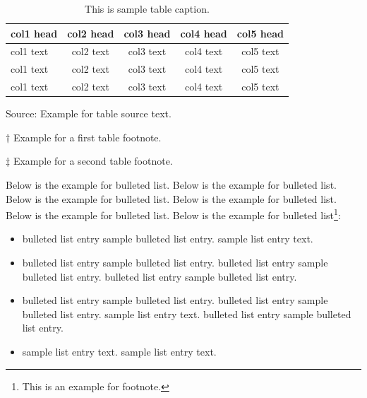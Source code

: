 \documentclass[AMA,STIX1COL]{WileyNJD-SP}
\begin{document}
\begin{center}
\begin{table}[t]%
\centering
\caption{This is sample table caption.\label{tab2}}%
\begin{tabular*}{500pt}{@{\extracolsep\fill}lcccc@{\extracolsep\fill}}
\toprule
\textbf{col1 head} & \textbf{col2 head}  & \textbf{col3 head}  & \textbf{col4 head}  & \textbf{col5 head} \\
\midrule
col1 text & col2 text  & col3 text  & col4 text  & col5 text\tnote{$\dagger$}   \\
col1 text & col2 text  & col3 text  & col4 text  & col5 text   \\
col1 text & col2 text  & col3 text  & col4 text  & col5 text\tnote{$\ddagger$}   \\
\bottomrule
\end{tabular*}
\begin{tablenotes}
\item Source: Example for table source text.
\item[$\dagger$] Example for a first table footnote.
\item[$\ddagger$] Example for a second table footnote.
\end{tablenotes}
\end{table}
\end{center}



Below is the example\cite{Liska2010,Kucharik2003,Blanchard2015} for bulleted list. Below is the example for bulleted list. Below is the example for bulleted list. Below is the example for bulleted list. Below is the example for bulleted list. Below is the example for bulleted list\footnote{This is an example for footnote.}:
\begin{itemize}
\item bulleted list entry sample bulleted list entry.\cite{Lauritzen2011} sample list entry text. 
\item bulleted list entry sample bulleted list entry. bulleted list entry sample bulleted list entry. bulleted list entry sample bulleted list entry.
\item bulleted list entry sample bulleted list entry.\cite{Klima2017} bulleted list entry sample bulleted list entry.\cite{Dukowicz2000} sample list entry text.  bulleted list entry sample bulleted list entry.
\item sample list entry text. sample list entry text.  
\end{itemize}
\end{document}
